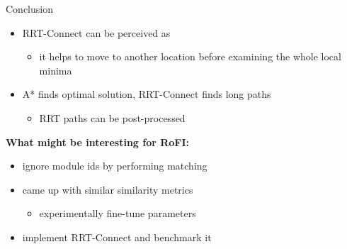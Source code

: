 \documentclass[ignorenonframetext,aspectratio=169,]{paradise-slide}
\providecommand{\tightlist}{%
  \setlength{\itemsep}{0pt}\setlength{\parskip}{0pt}}
\begin{document}
\begin{frame}[fragile]{Conclusion}
\protect\hypertarget{conclusion}{}

\begin{itemize}
\tightlist
\item
  RRT-Connect can be perceived as 

  \begin{itemize}
  \tightlist
  \item
    it helps to move to another location before examining the whole
    local minima
  \end{itemize}
\item
  A* finds optimal solution, RRT-Connect finds long paths

  \begin{itemize}
  \tightlist
  \item
    RRT paths can be post-processed
  \end{itemize}
\end{itemize}

\pause

\textbf{What might be interesting for RoFI:}

\begin{itemize}
\tightlist
\item
  ignore module ids by performing matching
\item
  came up with similar similarity metrics

  \begin{itemize}
  \tightlist
  \item
    experimentally fine-tune parameters
  \end{itemize}
\item
  implement RRT-Connect and benchmark it
\end{itemize}

\end{frame}
\end{document}
